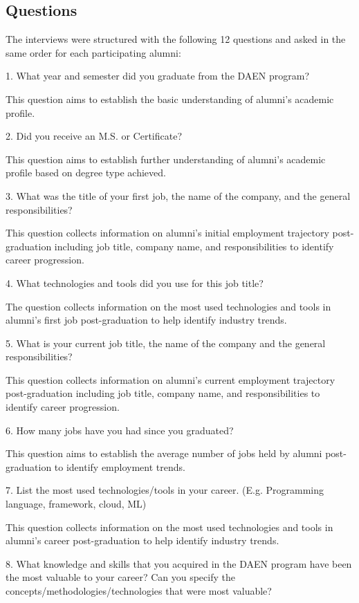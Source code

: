 \documentclass[12pt,a4paper]{article}
\begin{document}
\subsection{Questions}
The interviews were structured with the following 12 questions and asked in the same order for each participating alumni:

1. What year and semester did you graduate from the DAEN program? 

This question aims to establish the basic understanding of alumni's academic profile.

2. Did you receive an M.S. or Certificate? 

This question aims to establish further understanding of alumni's academic profile based on degree type achieved.

3. What was the title of your first job, the name of the company, and the general responsibilities?

This question collects information on alumni's initial employment trajectory post-graduation including job title, company name, and responsibilities to identify career progression.

4. What technologies and tools did you use for this job title? 

The question collects information on the most used technologies and tools in alumni's first job post-graduation to help identify industry trends.

5. What is your current job title, the name of the company and the general responsibilities?

This question collects information on alumni's current employment trajectory post-graduation including job title, company name, and responsibilities to identify career progression.

6. How many jobs have you had since you graduated? 

This question aims to establish the average number of jobs held by alumni post-graduation to identify employment trends.

7. List the most used technologies/tools in your career. (E.g. Programming language, framework, cloud, ML) 

This question collects information on the most used technologies and tools in alumni's career post-graduation to help identify industry trends.

8. What knowledge and skills that you acquired in the DAEN program have been the most valuable to your career? Can you specify the concepts/methodologies/technologies that were most valuable? 
\end{document}
